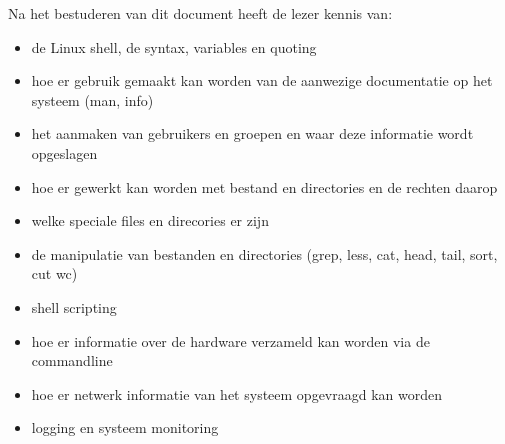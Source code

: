 Na het bestuderen van dit document heeft de lezer kennis van:
\begin{itemize}
\item de Linux shell, de syntax, variables en quoting
\item hoe er gebruik gemaakt kan worden van de aanwezige documentatie op het systeem (man, info)
\item het aanmaken van gebruikers en groepen en waar deze informatie wordt opgeslagen
\item hoe er gewerkt kan worden met bestand en directories en de rechten daarop
\item welke speciale files en direcories er zijn
\item de manipulatie van bestanden en directories (grep, less, cat, head, tail, sort, cut wc)
\item shell scripting
\item hoe er informatie over de hardware verzameld kan worden via de commandline
\item hoe er netwerk informatie van het systeem opgevraagd kan worden
\item logging en systeem monitoring
\end{itemize}
